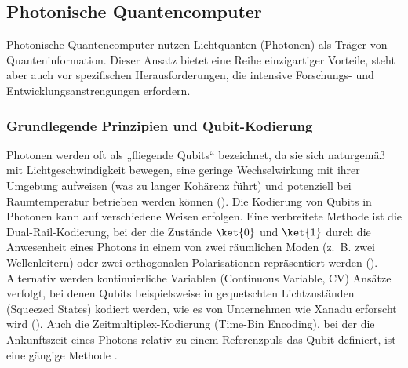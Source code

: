 \subsection{Photonische Quantencomputer}
Photonische Quantencomputer nutzen Lichtquanten (Photonen) als Träger von Quanteninformation. Dieser Ansatz bietet eine Reihe einzigartiger Vorteile, steht aber auch vor spezifischen Herausforderungen, die intensive Forschungs- und Entwicklungsanstrengungen erfordern.

\subsubsection{Grundlegende Prinzipien und Qubit-Kodierung}
Photonen werden oft als „fliegende Qubits“ bezeichnet, da sie sich naturgemäß mit Lichtgeschwindigkeit bewegen, eine geringe Wechselwirkung mit ihrer Umgebung aufweisen (was zu langer Kohärenz führt) und potenziell bei Raumtemperatur betrieben werden können (\cite{abughanemPhotonicQuantumComputers2024}). Die Kodierung von Qubits in Photonen kann auf verschiedene Weisen erfolgen. Eine verbreitete Methode ist die Dual-Rail-Kodierung, bei der die Zustände $\ket{0}$ und $\ket{1}$ durch die Anwesenheit eines Photons in einem von zwei räumlichen Moden (z. B. zwei Wellenleitern) oder zwei orthogonalen Polarisationen repräsentiert werden (\cite{slussarenkoPhotonicQuantumInformation2019}). Alternativ werden kontinuierliche Variablen (Continuous Variable, CV) Ansätze verfolgt, bei denen Qubits beispielsweise in gequetschten Lichtzuständen (Squeezed States) kodiert werden, wie es von Unternehmen wie Xanadu erforscht wird (\cite{QuantumComputingArchitecture}). Auch die Zeitmultiplex-Kodierung (Time-Bin Encoding), bei der die Ankunftszeit eines Photons relativ zu einem Referenzpuls das Qubit definiert, ist eine gängige Methode \cite{LinearOpticsScalable}.

